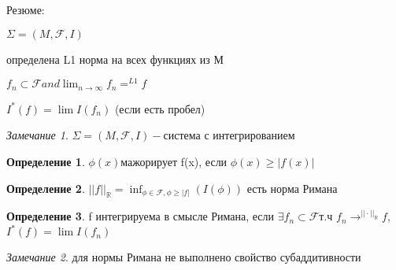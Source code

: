 \documentclass[a4paper]{article}
\theoremstyle{definition}
\newtheorem*{definition}{Определение}
\theoremstyle{remark}
\newtheorem*{remark}{Замечание}
\begin{document}
     Резюме:

     $\Sigma = (M, \mathcal{F} , I)$

     определена L1 норма на всех функциях из М

     $f_n\subset \mathcal{F} and \lim_{n\to\infty}f_n =^{L1} f$

     $I^*(f) = \lim I(f_n)$ (если есть пробел)
     \begin{remark}
          $\Sigma = (M, \mathcal{F}, I) -$система с интегрированием
     \end{remark}
     \begin{definition}
          $\phi(x)$мажорирует f(x), если $\phi(x)\geq |f(x)|$
     \end{definition}
     \begin{definition}
          $||f||_{\mathbb{R} } = \inf_{\phi \in \mathcal{F}, \phi \geq |f|} (I(\phi))$ есть норма Римана
     \end{definition}
     \begin{definition}
          f интегрируема в смысле Римана, если $\exists f_n\subset \mathcal{F} $т.ч $f_n\to^{||\cdot||_\mathbb{R} } f$,
          $I^*(f) = \lim I(f_n)$
     \end{definition}
     \begin{remark}
          для нормы Римана не выполнено свойство субаддитивности
     \end{remark}
\end{document}
